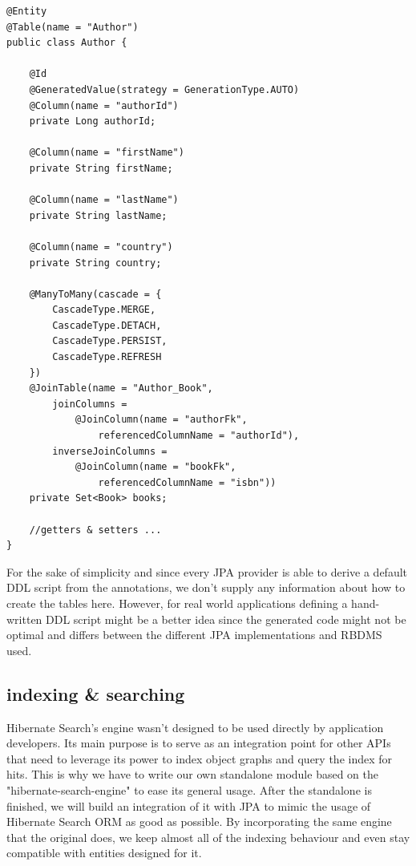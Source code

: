 \lstset{language=java}
\begin{lstlisting}[frame=htrbl, caption={Author.java}, label={lst:author.java_1}]
@Entity
@Table(name = "Author")
public class Author {
	
	@Id
	@GeneratedValue(strategy = GenerationType.AUTO)
	@Column(name = "authorId")
	private Long authorId;
	
	@Column(name = "firstName")
	private String firstName;
	
	@Column(name = "lastName")
	private String lastName;
	
	@Column(name = "country")
	private String country;
	
	@ManyToMany(cascade = {
		CascadeType.MERGE, 
		CascadeType.DETACH, 
		CascadeType.PERSIST, 
		CascadeType.REFRESH
	})
	@JoinTable(name = "Author_Book", 
		joinColumns = 
			@JoinColumn(name = "authorFk", 
				referencedColumnName = "authorId"),
		inverseJoinColumns = 
			@JoinColumn(name = "bookFk", 
				referencedColumnName = "isbn"))
	private Set<Book> books;
	
	//getters & setters ...
}
\end{lstlisting}
For the sake of simplicity and since every JPA provider is able to derive a default DDL script from the annotations, we don't supply any information about how to create the tables here. However, for real world applications defining a hand-written DDL script might be a better idea since the generated code might not be optimal and differs between the different JPA implementations and RBDMS used.

\subsection{indexing \& searching}
Hibernate Search's engine wasn't designed to be used directly by application developers. Its main purpose is to serve as an integration point for other APIs that need to leverage its power to index object graphs and query the index for hits. This is why we have to write our own standalone module based on the "hibernate-search-engine" to ease its general usage. After the standalone is finished, we will build an integration of it with JPA to mimic the usage of Hibernate Search ORM as good as possible. By incorporating the same engine that the original does, we keep almost all of the indexing behaviour and even stay compatible with entities designed for it.

